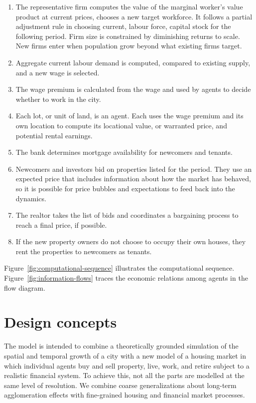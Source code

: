 \begin{enumerate}
\item The representative firm computes the value of the marginal worker's value product at current prices, chooses a new target workforce.  It follows a partial adjustment rule in choosing current, labour force, capital stock for the following period. Firm size is constrained by diminishing returns to scale. New firms enter when population grow beyond what existing firms target. 

\item Aggregate current labour demand is computed, compared to existing supply, and a new wage is selected. 

\item The wage premium is calculated from the wage and used by agents to decide whether to work in the city.

\item Each lot, or unit of land, is an agent. Each uses the wage premium and its own location to compute its locational value, or warranted price, and potential rental earnings. 

\item The bank determines mortgage availability for newcomers and tenants. 

\item Newcomers and investors bid on properties listed for the period. They use an expected price that includes information about how the market has behaved, so it is possible for price bubbles and expectations to feed back into the dynamics. 

\item The realtor takes the list of bids and coordinates a bargaining process to reach a final price, if possible. 

\item If the new property owners do not choose to occupy their own houses, they rent the properties to newcomers as tenants. %
\end{enumerate}

Figure~\ref{fig:computational-sequence} illustrates the computational sequence. %
Figure~\ref{fig:information-flows} traces the economic relations among agents in the flow diagram.

\section{Design concepts} %
The model is intended to combine a theoretically grounded simulation of the spatial and temporal growth of a city with a new model of a housing market in which individual agents buy and sell property, live, work, and retire subject to a realistic financial system. 
To achieve this, not all the parts are modelled at the same level of resolution. We combine coarse generalizations about long-term agglomeration effects with fine-grained housing and financial market processes. 

